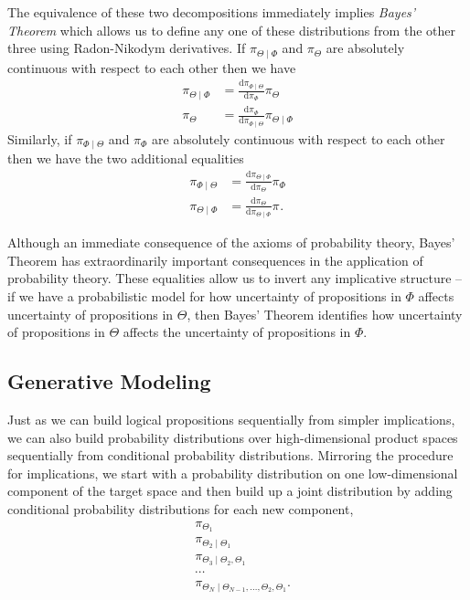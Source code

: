 The equivalence of these two decompositions immediately implies
\emph{Bayes' Theorem} which allows us to define any one of these
distributions from the other three using Radon-Nikodym derivatives. 
If $\pi_{\Theta \mid \Phi}$ and $\pi_{\Theta}$ are absolutely continuous
with respect to each other then we have
%
\begin{align*}
\pi_{\Theta \mid \Phi} &= 
\frac{ \mathrm{d} \pi_{\Phi \mid \Theta} }{ \mathrm{d} \pi_{\Phi} }
\pi_{ \Theta}
\\
\pi_{\Theta} &= 
\frac{ \mathrm{d} \pi_{\Phi} }{ \mathrm{d} \pi_{\Phi \mid \Theta} }
\pi_{ \Theta \mid \Phi }
\end{align*}
%
Similarly, if $\pi_{\Phi \mid \Theta}$ and $\pi_{\Phi}$ are absolutely 
continuous with respect to each other then we have the two additional
equalities
%
\begin{align*}
\pi_{\Phi \mid \Theta} &= 
\frac{ \mathrm{d} \pi_{\Theta \mid \Phi} }{ \mathrm{d} \pi_{\Theta} }
\pi_{\Phi}
\\
\pi_{\Theta \mid \Phi} &= 
\frac{ \mathrm{d} \pi_{\Theta} }{ \mathrm{d} \pi_{\Theta \mid \Phi} }
\pi_{ }.
\end{align*}

Although an immediate consequence of the axioms of probability
theory, Bayes' Theorem has extraordinarily important consequences 
in the application of probability theory.  These equalities allow us to 
invert any implicative structure -- if we have a probabilistic model for 
how uncertainty of propositions in $\Phi$ affects uncertainty of
propositions in $\Theta$, then Bayes'  Theorem identifies how 
uncertainty of propositions in $\Theta$ affects the uncertainty of
propositions in $\Phi$.

\subsection{Generative Modeling}

Just as we can build logical propositions sequentially from simpler
implications, we can also build probability distributions over 
high-dimensional product spaces sequentially from conditional 
probability distributions.  Mirroring the procedure for implications, 
we start with a probability distribution on one low-dimensional 
component of the target space and then build up a joint distribution 
by adding conditional probability distributions for each new component,
%
\begin{align*}
& \pi_{\Theta_{1}} \\
& \pi_{\Theta_{2} \mid \Theta_{1}} \\
& \pi_{\Theta_{3} \mid \Theta_{2}, \Theta_{1}} \\
& \cdots \\
& \pi_{\Theta_{N} \mid \Theta_{N - 1}, \ldots, \Theta_{2}, \Theta_{1}}.
\end{align*}

